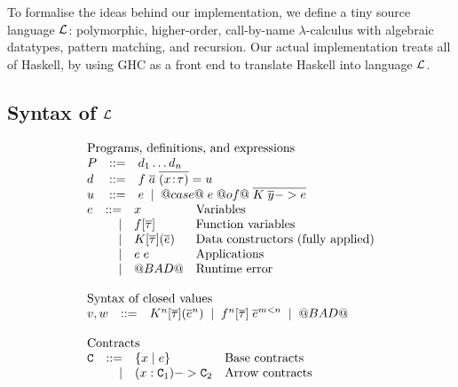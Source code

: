 To formalise the ideas behind our implementation, we define a
tiny source language $\cal L$:
polymorphic, higher-order, call-by-name $\lambda$-calculus with
algebraic datatypes, pattern matching, and recursion.
Our actual implementation treats all of Haskell, by using GHC as a front
end to translate Haskell into language $\cal L$.

\subsection{Syntax of $\cal L$} \label{s:syntax}

\begin{figure}
\[\begin{array}{l}
\begin{array}{lrll}
\multicolumn{3}{l}{\text{Programs, definitions, and expressions}} \\
P   & ::= & d_1 \ldots d_n \\
d   & ::= & f\; \ol{a} \; \ol{(x\!:\!\tau)} = u \\
u   & ::= & e \; \mid \; @case@\;e\;@of@\;\ol{K\;\ol{y} -> e}
\end{array}
\\
\begin{array}{lrll}
e  & ::=  & x            & \text{Variables} \\
   & \mid & f[\ol{\tau}] & \text{Function variables} \\
   & \mid & K[\ol{\tau}](\ol{e}) & \text{Data constructors (fully applied)} \\
   & \mid & e\;e         & \text{Applications} \\
   & \mid & @BAD@        & \text{Runtime error} \\
\end{array}\\ \\
\begin{array}{lrll}
\multicolumn{3}{l}{\text{Syntax of closed values}} \\
 v,w & ::= & K^\ar[\ol{\tau}](\oln{e}{\ar}) \;\mid\; f^\ar[\ol{\tau}]\;\oln{e}{m < \ar} \;\mid\; @BAD@ \\ \\
\end{array}
\\
\begin{array}{lrll}
\multicolumn{3}{l}{\text{Contracts}} \\
 \Ct & ::=  & \{ x \mid e \}        & \text{Base contracts}  \\
     & \mid &  (x : \Ct_1) -> \Ct_2      & \text{Arrow contracts} \\

\end{array}
\end{array}\]
\end{figure}
